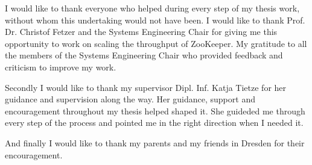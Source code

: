 I would like to thank everyone who helped during every step of my thesis work, without whom this undertaking would not have been. I would like to thank Prof. Dr. Christof Fetzer and the Systems Engineering Chair for giving me this opportunity to work on scaling the throughput of ZooKeeper. My gratitude to all the members of the Systems Engineering Chair who provided feedback and criticism to improve my work.

Secondly I would like to thank my supervisor Dipl. Inf. Katja Tietze for her guidance and supervision along the way. Her guidance, support and encouragement throughout my thesis helped shaped it. She guideded me through every step of the process and pointed me in the right direction when I needed it.

And finally I would like to thank my parents and my friends in Dresden for their encouragement.
